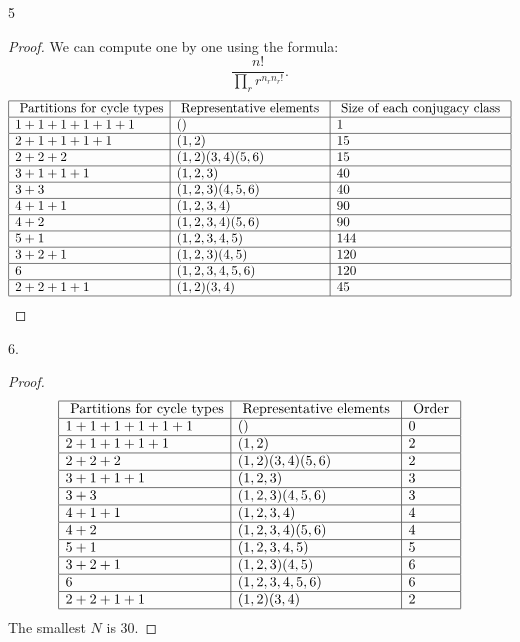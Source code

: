 \begin{exercise}
    5
\end{exercise}

\begin{proof}
    We can compute one by one using the formula:
    \begin{equation}
        \frac{n !}{\prod_{r} r^{n_{r} n_{r} !}}.
        \end{equation}
    $$
\begin{array}{|l|l|l|}\hline 
\text { Partitions for cycle types} & {\text { Representative elements }} & {\text { Size of each conjugacy class }} \\ \hline
1+1+1+1+1+1 & {()} & {1} \\ \hline 
2+1+1+1+1 & {(1,2)} & 15\\ \hline 
2+2+2 & {(1,2)(3,4)(5,6)} & 15\\ \hline 
3+1+1+1 & {(1,2,3)} & {40} \\ \hline 
3+3 & {(1,2,3)(4,5,6)} & {40} \\ \hline 
4+1+1 & {(1,2,3,4)} & {90} \\ \hline 
4+2 & {(1,2,3,4)(5,6)} & {90} \\ \hline 
5+1 & {(1,2,3,4,5)} & {144}\\ \hline 
3+2+1 & {(1,2,3)(4,5)} & {120}  \\ \hline 
6 & {(1,2,3,4,5,6)} & {120}  \\ \hline 
2+2+1+1 & {(1,2)(3,4)} & {45} \\ \hline\end{array}
$$
\end{proof}

\begin{exercise}
    6.
\end{exercise}

\begin{proof}
    $$
    \begin{array}{|l|l|l|}\hline 
        \text { Partitions for cycle types} & {\text { Representative elements }} & {\text { Order }} \\ \hline
        1+1+1+1+1+1 & {()} & 0 \\ \hline 
        2+1+1+1+1 & {(1,2)} & 2\\ \hline 
        2+2+2 & {(1,2)(3,4)(5,6)} & 2\\ \hline 
        3+1+1+1 & {(1,2,3)} & 3 \\ \hline 
        3+3 & {(1,2,3)(4,5,6)} & 3 \\ \hline 
        4+1+1 & {(1,2,3,4)} & 4 \\ \hline 
        4+2 & {(1,2,3,4)(5,6)} & 4 \\ \hline 
        5+1 & {(1,2,3,4,5)} & 5\\ \hline 
        3+2+1 & {(1,2,3)(4,5)} & 6  \\ \hline 
        6 & {(1,2,3,4,5,6)} & 6  \\ \hline 
        2+2+1+1 & {(1,2)(3,4)} & 2 \\ \hline\end{array}
        $$
        The smallest $N$ is 30.
\end{proof}

